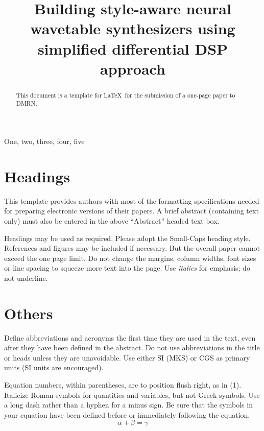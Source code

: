 \documentclass{article}
\title{Building style-aware neural wavetable synthesizers using simplified differential DSP approach}
\begin{document}
\tenpt
\maketitle

\begin{sloppy}
\begin{abstract}
This document is a template for \LaTeX\ for the submission of a one-page paper to DMRN. 
\end{abstract}

\begin{keywords}
One, two, three, four, five
\end{keywords}

\section{Headings}
\label{sec:headings}
This template provides authors with most of the formatting specifications needed for preparing electronic versions of their papers. A brief abstract (containing text only) must also be entered in the above ``Abstract'' headed text box.

Headings may be used as required. Please adopt the Small-Caps heading style. References and figures may be included if necessary. But the overall paper cannot exceed the one page limit. Do not change the margins, column widths, font sizes or line spacing to squeeze more text into the page. Use \textit{italics} for emphasis; do not underline. 

\section{Others}
\label{sec:others}
Define abbreviations and acronyms the first time they are used in the text, even after they have been defined in the abstract. Do not use abbreviations in the title or heads unless they are unavoidable. Use either SI (MKS) or CGS as primary units (SI units are encouraged).

Equation numbers, within parentheses, are to position flush right, as in (1). Italicize Roman symbols for quantities and variables, but not Greek symbols. Use a long dash rather than a hyphen for a minus sign. Be sure that the symbols in your equation have been defined before or immediately following the equation.
\begin{equation}
\alpha + \beta = \gamma
\end{equation}


\end{sloppy}
\end{document}

